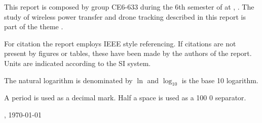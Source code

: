 
This report is composed by group CE6-633 during the 6th semester of \projectFaculty{} at \AAU{}, \the\year. The study of wireless power transfer and drone tracking described in this report is part of the theme \textit{\projectTheme}. 

For citation the report employs IEEE style referencing. If citations are not present by figures or tables, these have been made by the authors of the report. Units are indicated according to the SI system.

The natural logarithm is denominated by $\ln$ and $\log_{10}$ is the base 10 logarithm.

A period is used as a decimal mark. Half a space is used as a 100 0 separator.

\vspace{\baselineskip}\hfill \AAU, \today
\vfill\noindent

